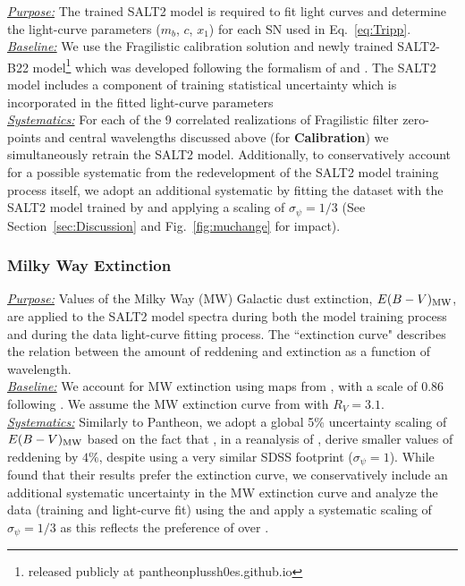 \documentclass[twocolumn]{aastex63}
\begin{document}
\noindent\uline{\textit{Purpose:}} The trained SALT2 model is required to fit light curves and determine the light-curve parameters ($m_b$, $c$, $x_1$) for each SN used in Eq.~\ref{eq:Tripp}. \\
\uline{\textit{Baseline:}} We use the Fragilistic calibration solution and newly trained { SALT2-B22 model\footnote{released publicly at pantheonplussh0es.github.io}} which was developed following the formalism of \cite{Guy10} and \cite{taylor21}. { The SALT2 model includes a component of training statistical uncertainty which is incorporated in the fitted light-curve parameters} \\
\uline{\textit{Systematics:}} For each of the 9 correlated realizations of Fragilistic { filter zero-points and central wavelengths} discussed above (for \textbf{Calibration}) we simultaneously retrain the SALT2 model. Additionally, to
conservatively account for a possible systematic from the redevelopment of the SALT2 model training process itself,
we adopt an additional systematic by fitting the dataset with the SALT2 model trained by \cite{Betoule14} and applying a scaling of $\sigma_\psi=1/3$ { (See Section~\ref{sec:Discussion} and Fig.~\ref{fig:muchange} for impact)}.\\


\subsubsection{\textbf{Milky Way Extinction}}
\label{subsubsection:mw}

\noindent\uline{\textit{Purpose:}} Values of the Milky Way (MW) Galactic dust extinction, $E(B-V)_{\rm MW}$, are applied to the SALT2 model spectra during both the model training process and during the data light-curve fitting process. The ``extinction curve" describes the relation between the amount of reddening and extinction as a function of wavelength. \\
\uline{\textit{Baseline:}} We account for MW extinction using maps from \cite{schlegel98}, with a scale of 0.86 following \cite{sfd1}. We assume the MW extinction curve from \cite{Fitzpatrick99} with $R_V=3.1$. \\
\uline{\textit{Systematics:}} Similarly to Pantheon, we adopt a global 5\% uncertainty scaling of $E(B-V)_{\rm MW}$ based on the fact that \cite{sfd2}, in a reanalysis of \cite{sfd1},  derive smaller values of reddening by $ 4\%$, despite using a very similar SDSS footprint ($\sigma_\psi=1$). While \cite{Schlafly11} found that their results prefer the \cite{Fitzpatrick99} extinction curve, we conservatively include an additional systematic uncertainty in the MW extinction curve and {analyze the data (training and light-curve fit)}
 using the \cite{ccm} and apply a systematic scaling of $\sigma_\psi=1/3$ {as this reflects the preference of \cite{Fitzpatrick99} over \cite{ccm}}.
\end{document}
